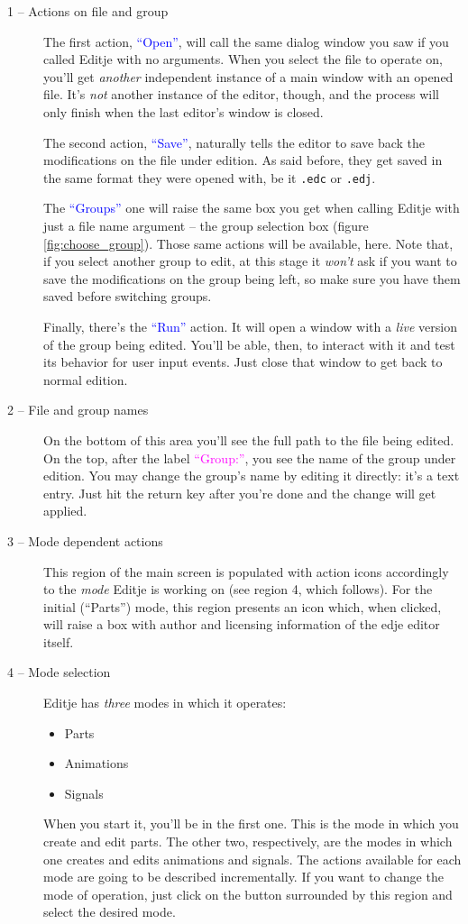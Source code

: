 \documentclass[a4paper]{profusion}
\newcommand{\GUIIcon}[1]{\textcolor{blue}{#1}}    %
\newcommand{\GUILabel}[1]{\textcolor{magenta}{#1}}
\begin{document}
\begin{description}
\item[1 -- Actions on file and group]
  The first action, \GUIIcon{``Open''}, will call the same dialog
  window you saw if you called Editje with no arguments. When you
  select the file to operate on, you'll get \emph{another} independent
  instance of a main window with an opened file. It's \emph{not}
  another instance of the editor, though, and the process will only
  finish when the last editor's window is closed.

  The second action, \GUIIcon{``Save''}, naturally tells the editor to
  save back the modifications on the file under edition. As said
  before, they get saved in the same format they were opened with, be
  it \texttt{.edc} or \texttt{.edj}.

  The \GUIIcon{``Groups''} one will raise the same box you get when
  calling Editje with just a file name argument -- the group selection
  box (figure \ref{fig:choose_group}). Those same actions will be
  available, here. Note that, if you select another group to edit, at
  this stage it \emph{won't} ask if you want to save the modifications
  on the group being left, so make sure you have them saved before
  switching groups.

  Finally, there's the \GUIIcon{``Run''} action. It will open a window
  with a \emph{live} version of the group being edited. You'll be
  able, then, to interact with it and test its behavior for user input
  events. Just close that window to get back to normal edition.

\item[2 -- File and group names] On the bottom of this area you'll see
  the full path to the file being edited. On the top, after the label
  \GUILabel{``Group:''}, you see the name of the group under
  edition. You may change the group's name by editing it directly:
  it's a text entry. Just hit the return key after you're done and the
  change will get applied.

\item[3 -- Mode dependent actions] This region of the main screen is
  populated with action icons accordingly to the \emph{mode} Editje is
  working on (see region 4, which follows). For the initial
  (``Parts'') mode, this region presents an icon which, when clicked,
  will raise a box with author and licensing information of the edje
  editor itself.

\item[4 -- Mode selection] Editje has \emph{three} modes in which it
  operates:
  \begin{itemize}
  \item Parts
  \item Animations
  \item Signals
  \end{itemize}
  When you start it, you'll be in the first one. This is the mode in
  which you create and edit parts. The other two, respectively, are
  the modes in which one creates and edits animations and signals. The
  actions available for each mode are going to be described
  incrementally. If you want to change the mode of operation, just
  click on the button surrounded by this region and select the desired
  mode.


\end{description}
\end{document}
